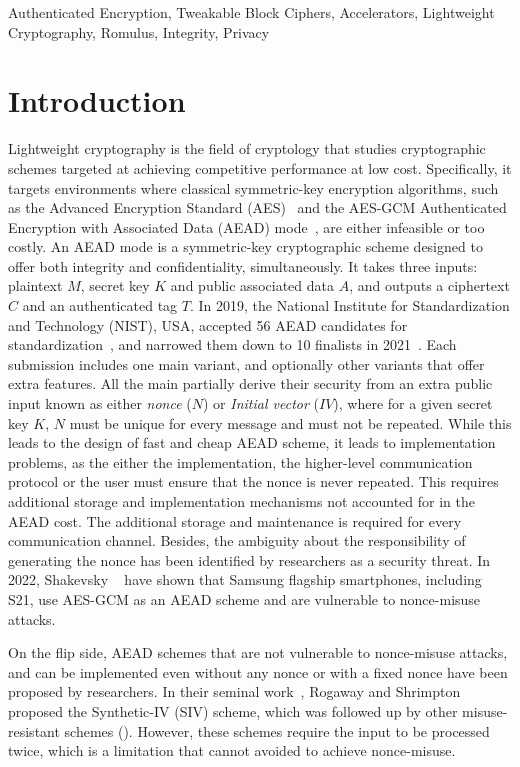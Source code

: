 \documentclass[conference]{IEEEtran}
\begin{document}
\begin{IEEEkeywords}
Authenticated Encryption, Tweakable Block Ciphers, Accelerators, Lightweight Cryptography, Romulus, Integrity, Privacy
\end{IEEEkeywords}

\section{Introduction}

Lightweight cryptography is the field of cryptology that studies cryptographic schemes targeted at achieving competitive performance at low cost. Specifically, it targets environments where classical symmetric-key encryption algorithms, such as the Advanced Encryption Standard (AES)~\cite{daemen2001reijndael} and the AES-GCM Authenticated Encryption with Associated Data (AEAD) mode~\cite{mcgrew2004galois}, are either infeasible or too costly. An AEAD mode is a symmetric-key cryptographic scheme designed to offer both integrity and confidentiality, simultaneously. It takes three inputs: plaintext $M$, secret key $K$ and public associated data $A$, and outputs a ciphertext $C$ and an authenticated tag $T$. In 2019, the National Institute for Standardization and Technology (NIST), USA, accepted 56 AEAD candidates for standardization~\cite{turan2019status}, and narrowed them down to 10 finalists in 2021~\cite{turan2021status}. Each submission includes one main variant, and optionally other variants that offer extra features. All the main partially derive their security from an extra public input known as either {\it nonce} ($N$) or {\it Initial vector} ($IV$), where for a given secret key $K$, $N$ must be unique for every message and must not be repeated. While this leads to the design of fast and cheap AEAD scheme, it leads to implementation problems, as the either the implementation, the higher-level communication protocol or the user must ensure that the nonce is never repeated. This requires additional storage and implementation mechanisms not accounted for in the AEAD cost. The additional storage and maintenance is required for every communication channel. Besides, the ambiguity about the responsibility of generating the nonce has been identified by researchers as a security threat. In 2022, Shakevsky \etal~\cite{shakevsky2022trust} have shown that Samsung flagship smartphones, including S21, use AES-GCM as an AEAD scheme and are vulnerable to nonce-misuse attacks.

On the flip side, AEAD schemes that are not vulnerable to nonce-misuse attacks, and can be implemented even without any nonce or with a fixed nonce have been proposed by researchers. In their seminal work~\cite{rogaway2006provable}, Rogaway and Shrimpton proposed the Synthetic-IV (SIV) scheme, which was followed up by other misuse-resistant schemes (\cite{jean2016deoxys,gueron2017aes}). However, these schemes require the input to be processed twice, which is a limitation that cannot avoided to achieve nonce-misuse.
\end{document}
